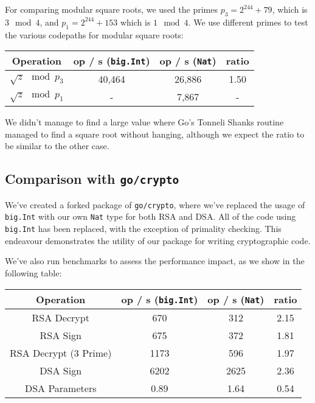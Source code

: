 \documentclass[11pt, a4paper]{article} %
\begin{document}
{For comparing modular square roots, we used the primes
$p_3 = 2^{244} + 79$, which is $3 \mod 4$,
and $p_1 = 2^{244} + 153$ which is $1 \mod 4$. We use different primes
to test the various codepaths for modular square roots:

\begin{center}
 \begin{tabular}{|c | c | c | c|} 
 \hline
 Operation & op / s (\texttt{big.Int}) & op / s (\texttt{Nat}) & ratio \\ [0.5ex] 
 \hline\hline
 $\sqrt{z} \mod p_3$ & 40,464 & 26,886 & 1.50 \\
 \hline
 $\sqrt{z} \mod p_1$ & - & 7,867 & - \\
 \hline
\end{tabular}
\end{center}

We didn't manage to find a large value where Go's Tonneli Shanks routine
managed to find a square root without hanging, although we
expect the ratio to be similar to the other case.

\subsection{Comparison with \texttt{go/crypto}}

We've created a forked package
\cite{meier_cronokirbyctcrypto_2021}
of \texttt{go/crypto}, where we've replaced the usage of \texttt{big.Int}
with our own \texttt{Nat} type for both RSA and DSA. All of the code
using \texttt{big.Int} has been replaced, with the exception of
primality checking. This endeavour demonstrates the utility of
our package for writing cryptographic code.

We've also run benchmarks to assess the performance impact, as we
show in the following table:

\begin{center}
 \begin{tabular}{|c | c | c | c|} 
 \hline
 Operation & op / s (\texttt{big.Int}) & op / s (\texttt{Nat}) & ratio \\ [0.5ex] 
 \hline\hline
 RSA Decrypt & 670 & 312 & 2.15 \\
 \hline
 RSA Sign & 675 & 372 & 1.81 \\
 \hline
 RSA Decrypt (3 Prime) & 1173 & 596 & 1.97 \\
 \hline
 DSA Sign & 6202 & 2625 & 2.36 \\
 \hline
 DSA Parameters & 0.89 & 1.64 & 0.54 \\
 \hline
\end{tabular}
\end{center}

}
\end{document}
